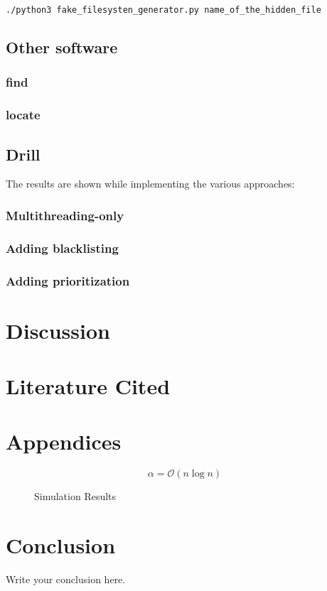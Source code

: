 \documentclass[12pt]{article}
\newcommand{\bigO}{\mathcal{O}}
\begin{document}
\begin{lstlisting}
./python3 fake_filesysten_generator.py name_of_the_hidden_file
\end{lstlisting}


\subsection{Other software}

\subsubsection{find}

\subsubsection{locate}

\subsection{Drill}

The results are shown while implementing the various approaches:

\subsubsection{Multithreading-only}


\subsubsection{Adding blacklisting}

\subsubsection{Adding prioritization}


\section{Discussion}

\section{Literature Cited}


\section{Appendices}

\begin{equation}
    \label{simple_equation}
    \alpha = \bigO(n\log n)
\end{equation}



\begin{figure}
    \centering
    \caption{Simulation Results}
    \label{simulationfigure}
\end{figure}

\section{Conclusion}
Write your conclusion here.
\end{document}
